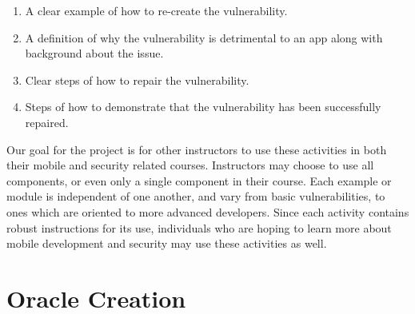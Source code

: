 \documentclass{sig-alternate-05-2015}
\begin{document}




\begin{enumerate} 
	\setlength{\itemsep}{.8pt} %
    	\setlength{\parskip}{0pt} %
    	\setlength{\parsep}{0pt}  %
   
	\item A clear example of how to re-create the vulnerability.
	\item A definition of why the vulnerability is detrimental to an app along with background about the issue.
	\item Clear steps of how to repair the vulnerability.
	\item Steps of how to demonstrate that the vulnerability has been successfully repaired.

\end{enumerate}

Our goal for the project is for other instructors to use these activities in both their mobile and security related courses. Instructors may choose to use all components, or even only a single component in their course. Each example or module is independent of one another, and vary from basic vulnerabilities, to ones which are oriented to more advanced developers. Since each activity contains robust instructions for its use, individuals who are hoping to learn more about mobile development and security may use these activities as well.





\section{Oracle Creation}
\label{sec:oraclecreation}

\end{document}
